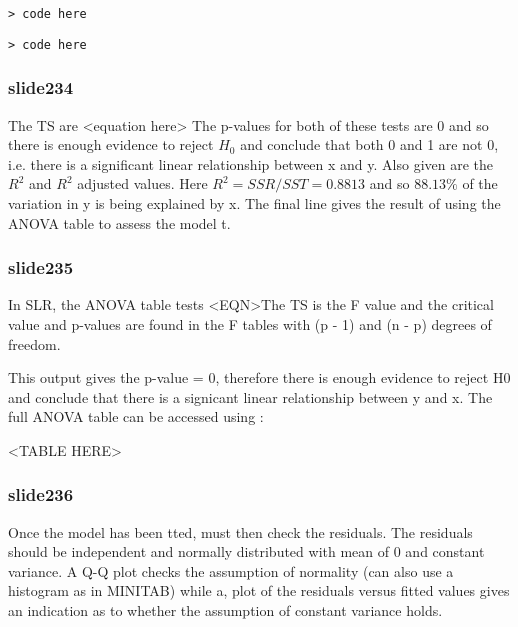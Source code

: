 \begin{itemize}


\large \begin{verbatim}
> code here
\end{verbatim}\large


\large \begin{verbatim}
> code here
\end{verbatim}\large



\subsubsection{slide234}
The TS are <equation here>  
The p-values for both of these tests are 0 and so there is enough evidence to reject $H_0$ and conclude that both 0 and 1 are not 0, i.e. there is a significant linear relationship between x and y. 
Also given are the $R^2$ and $R^2$ adjusted values. Here $R^2 = SSR/SST = 0.8813$ and so $88.13\%$ of the variation in y is being explained by x. 
The final line gives the result of using the ANOVA table to assess the model t.


\subsubsection{slide235}

In SLR, the ANOVA table tests <EQN>The TS is the F value and the critical value and p-values are found
in the F tables with (p - 1) and (n - p) degrees of freedom.

This output gives the p-value = 0, therefore there is enough evidence to reject H0 and conclude that there is a signicant linear relationship between y and x. The full ANOVA table can be accessed using :

<TABLE HERE>



\subsubsection{slide236}
Once the model has been tted, must then check the residuals.
The residuals should be independent and normally distributed with
mean of 0 and constant variance.
A Q-Q plot checks the assumption of normality (can also use a
histogram as in MINITAB) while a, plot of the residuals versus fitted values gives an indication as to whether the assumption of constant variance holds.


\end{itemize}
